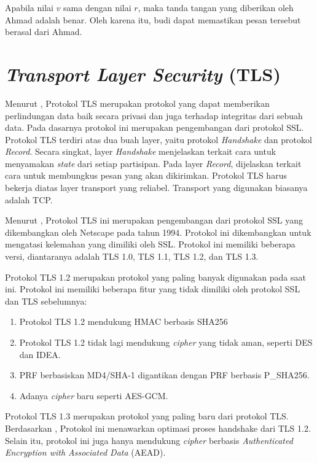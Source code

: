 Apabila nilai $v$ sama dengan nilai $r$, maka tanda tangan yang diberikan oleh Ahmad adalah benar. Oleh karena itu, budi dapat memastikan pesan tersebut berasal dari Ahmad.

\section{\emph{Transport Layer Security} (TLS)}
\label{sec:tls}

Menurut \textcite{rfc5246}, Protokol TLS merupakan protokol yang dapat memberikan perlindungan data baik secara privasi dan juga terhadap integritas dari sebuah data. Pada dasarnya protokol ini merupakan pengembangan dari protokol SSL. Protokol TLS terdiri atas dua buah layer, yaitu protokol \emph{Handshake} dan protokol \emph{Record}. Secara singkat, layer \emph{Handshake} menjelaskan terkait cara untuk menyamakan \emph{state} dari setiap partisipan. Pada layer \emph{Record}, dijelaskan terkait cara untuk membungkus pesan yang akan dikirimkan. Protokol TLS harus bekerja diatas layer transport yang reliabel. Transport yang digunakan biasanya adalah TCP.

Menurut \textcite{munir2019}, Protokol TLS ini merupakan pengembangan dari protokol SSL yang dikembangkan oleh Netscape pada tahun 1994. Protokol ini dikembangkan untuk mengatasi kelemahan yang dimiliki oleh SSL. Protokol ini memiliki beberapa versi, diantaranya adalah TLS 1.0, TLS 1.1, TLS 1.2, dan TLS 1.3. 

Protokol TLS 1.2 merupakan protokol yang paling banyak digunakan pada saat ini. Protokol ini memiliki beberapa fitur yang tidak dimiliki oleh protokol SSL dan TLS sebelumnya:
\begin{enumerate}
  \item Protokol TLS 1.2 mendukung HMAC berbasis SHA256
  \item Protokol TLS 1.2 tidak lagi mendukung \emph{cipher} yang tidak aman, seperti DES dan IDEA.
  \item PRF berbasiskan MD4/SHA-1 digantikan dengan PRF berbasis P\_SHA256.
  \item Adanya \emph{cipher} baru seperti AES-GCM.
\end{enumerate}

Protokol TLS 1.3 merupakan protokol yang paling baru dari protokol TLS. Berdasarkan \textcite{rfc8446}, Protokol ini menawarkan optimasi proses handshake dari TLS 1.2. Selain itu, protokol ini juga hanya mendukung \emph{cipher} berbasis \emph{Authenticated Encryption with Associated Data} (AEAD).


